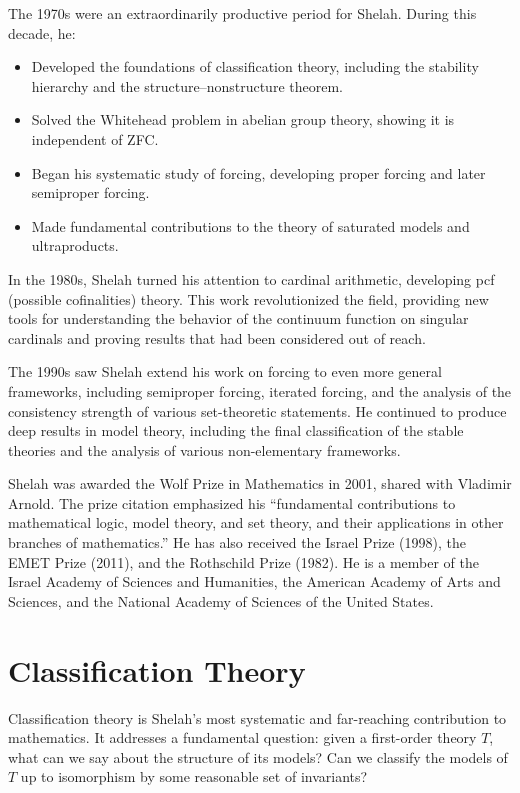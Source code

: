 The 1970s were an extraordinarily productive period for Shelah. During this decade, he:
\begin{itemize}
    \item Developed the foundations of classification theory, including the stability hierarchy and the structure--nonstructure theorem.
    \item Solved the Whitehead problem in abelian group theory, showing it is independent of ZFC.
    \item Began his systematic study of forcing, developing proper forcing and later semiproper forcing.
    \item Made fundamental contributions to the theory of saturated models and ultraproducts.
\end{itemize}

In the 1980s, Shelah turned his attention to cardinal arithmetic, developing pcf (possible cofinalities) theory. This work revolutionized the field, providing new tools for understanding the behavior of the continuum function on singular cardinals and proving results that had been considered out of reach.

The 1990s saw Shelah extend his work on forcing to even more general frameworks, including semiproper forcing, iterated forcing, and the analysis of the consistency strength of various set-theoretic statements. He continued to produce deep results in model theory, including the final classification of the stable theories and the analysis of various non-elementary frameworks.

Shelah was awarded the Wolf Prize in Mathematics in 2001, shared with Vladimir Arnold. The prize citation emphasized his ``fundamental contributions to mathematical logic, model theory, and set theory, and their applications in other branches of mathematics.'' He has also received the Israel Prize (1998), the EMET Prize (2011), and the Rothschild Prize (1982). He is a member of the Israel Academy of Sciences and Humanities, the American Academy of Arts and Sciences, and the National Academy of Sciences of the United States.

\section{Classification Theory}

Classification theory is Shelah's most systematic and far-reaching contribution to mathematics. It addresses a fundamental question: given a first-order theory \(T\), what can we say about the structure of its models? Can we classify the models of \(T\) up to isomorphism by some reasonable set of invariants?

